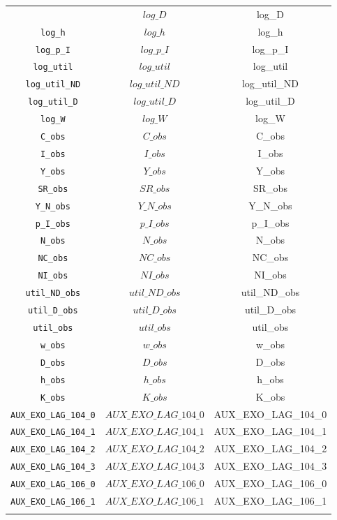 \begin{center}
\begin{longtable}{ccc}
{\texttt{log\_D} & $log\_D$ & log\_D\\
\texttt{log\_h} & $log\_h$ & log\_h\\
\texttt{log\_p\_I} & $log\_p\_I$ & log\_p\_I\\
\texttt{log\_util} & $log\_util$ & log\_util\\
\texttt{log\_util\_ND} & $log\_util\_ND$ & log\_util\_ND\\
\texttt{log\_util\_D} & $log\_util\_D$ & log\_util\_D\\
\texttt{log\_W} & $log\_W$ & log\_W\\
\texttt{C\_obs} & $C\_obs$ & C\_obs\\
\texttt{I\_obs} & $I\_obs$ & I\_obs\\
\texttt{Y\_obs} & $Y\_obs$ & Y\_obs\\
\texttt{SR\_obs} & $SR\_obs$ & SR\_obs\\
\texttt{Y\_N\_obs} & $Y\_N\_obs$ & Y\_N\_obs\\
\texttt{p\_I\_obs} & $p\_I\_obs$ & p\_I\_obs\\
\texttt{N\_obs} & $N\_obs$ & N\_obs\\
\texttt{NC\_obs} & $NC\_obs$ & NC\_obs\\
\texttt{NI\_obs} & $NI\_obs$ & NI\_obs\\
\texttt{util\_ND\_obs} & $util\_ND\_obs$ & util\_ND\_obs\\
\texttt{util\_D\_obs} & $util\_D\_obs$ & util\_D\_obs\\
\texttt{util\_obs} & $util\_obs$ & util\_obs\\
\texttt{w\_obs} & $w\_obs$ & w\_obs\\
\texttt{D\_obs} & $D\_obs$ & D\_obs\\
\texttt{h\_obs} & $h\_obs$ & h\_obs\\
\texttt{K\_obs} & $K\_obs$ & K\_obs\\
\texttt{AUX\_EXO\_LAG\_104\_0} & $AUX\_EXO\_LAG\_104\_0$ & AUX\_EXO\_LAG\_104\_0\\
\texttt{AUX\_EXO\_LAG\_104\_1} & $AUX\_EXO\_LAG\_104\_1$ & AUX\_EXO\_LAG\_104\_1\\
\texttt{AUX\_EXO\_LAG\_104\_2} & $AUX\_EXO\_LAG\_104\_2$ & AUX\_EXO\_LAG\_104\_2\\
\texttt{AUX\_EXO\_LAG\_104\_3} & $AUX\_EXO\_LAG\_104\_3$ & AUX\_EXO\_LAG\_104\_3\\
\texttt{AUX\_EXO\_LAG\_106\_0} & $AUX\_EXO\_LAG\_106\_0$ & AUX\_EXO\_LAG\_106\_0\\
\texttt{AUX\_EXO\_LAG\_106\_1} & $AUX\_EXO\_LAG\_106\_1$ & AUX\_EXO\_LAG\_106\_1\\
}
\end{longtable}
\end{center}
